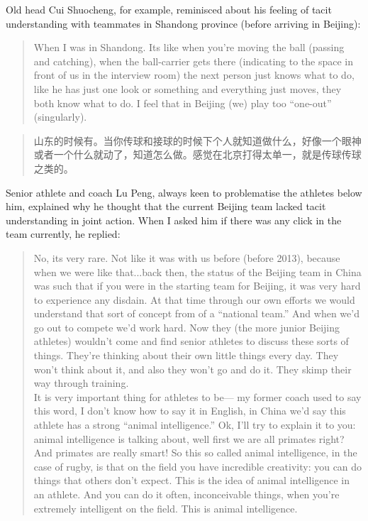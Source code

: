 \begin{CJK}{UTF8}{gbsn}
Old head Cui Shuocheng, for example, reminisced about his feeling of tacit understanding with teammates in Shandong province (before arriving in Beijing):

\begin{quotation}
      When I was in Shandong. Its like when you're moving the ball (passing and catching), when the ball-carrier gets there (indicating to the space in front of us in the interview room) the next person just knows what to do, like he has just one look or something and everything just moves, they both know what to do. I feel that in Beijing (we) play too ``one-out'' (singularly).
\end{quotation}

\begin{quotation}
     	山东的时候有。当你传球和接球的时候下个人就知道做什么，好像一个眼神或者一个什么就动了，知道怎么做。感觉在北京打得太单一，就是传球传球之类的。
\end{quotation}


Senior athlete and coach Lu Peng, always keen to problematise the athletes below him, explained why he thought that the current Beijing team lacked tacit understanding in joint action.  When I asked him if there was any click in the team currently, he replied:

      \begin{quotation}
        No, its very rare.  Not like it was with us before (before 2013), because when we were like that...back then, the status of the Beijing team in China was such that if you were in the starting team for Beijing, it was very hard to experience any disdain.  At that time through our own efforts we would understand that sort of concept from of a ``national team.'' And when we'd go out to compete we'd work hard.  Now they (the more junior Beijing athletes) wouldn't come and find senior athletes to discuss these sorts of things.  They're thinking about their own little things every day.  They won't think about it, and also they won't go and do it.  They skimp their way through training.  \\

        It is very important thing for athletes to be--- my former coach used to say this word, I don't know how to say it in English, in China we'd say this athlete has a strong ``animal intelligence.'' Ok, I'll try to explain it to you: animal intelligence is talking about, well first we are all primates right?  And primates are really smart!  So this so called animal intelligence, in the case of rugby, is that on the field you have incredible creativity: you can do things that others don't expect.  This is the idea of animal intelligence in an athlete.  And you can do it often, inconceivable things, when you're extremely intelligent on the field. This is animal intelligence.
      \end{quotation}


\end{CJK}
